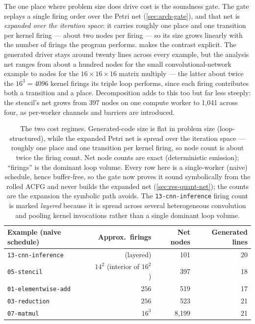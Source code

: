 The one place where problem size does drive cost is the soundness gate. The gate
replays a single firing order over the Petri net (\cref{sec:arch-gate}), and that net
is \emph{expanded over the iteration space}: it carries roughly one place and one
transition per kernel firing --- about two nodes per firing --- so its size grows
linearly with the number of firings the program performs.  makes
the contrast explicit. The generated driver stays around twenty lines across every
example, but the analysis net ranges from about a hundred nodes for the small
convolutional-network example to \qnetmatmul{} nodes for the $16\times16\times16$
matrix multiply --- the latter about twice the $16^3 = 4096$ kernel firings its triple
loop performs, since each firing contributes both a transition and a place.
Decomposition adds to this too but far less steeply: the stencil's net grows from 397
nodes on one compute worker to 1{,}041 across four, as per-worker channels and
barriers are introduced.

\begin{table}[t]
  \centering
  \small
  \begin{tabular}{@{}lrrr@{}}
    \toprule
    Example (naive schedule) & Approx.\ firings & Net nodes & Generated lines \\
    \midrule
    \texttt{13-cnn-inference} & (layered) & 101   & 20 \\
    \texttt{05-stencil}       & $14^2$ (interior of $16^2$) & 397 & 18 \\
    \texttt{01-elementwise-add} & $256$   & 519   & 17 \\
    \texttt{03-reduction}     & $256$     & 523   & 21 \\
    \texttt{07-matmul}        & $16^3$    & 8{,}199 & 21 \\
    \bottomrule
  \end{tabular}
  \caption{The two cost regimes. Generated-code size is flat in problem size
  (loop-structured), while the expanded Petri net is spread
  over the iteration space --- roughly one place and one transition per kernel firing,
  so node count is about twice the firing count. Net node counts are exact
  (deterministic emission); ``firings'' is the dominant loop volume. Every row here is a
  single-worker (naive) schedule, hence buffer-free, so the gate now proves it sound
  symbolically from the rolled ACFG and never builds the expanded net (\cref{sec:res-quant-net});
  the counts are the expansion the symbolic path avoids. The
  \texttt{13-cnn-inference} firing count is marked \emph{layered} because it is
  spread across several heterogeneous convolution and pooling kernel invocations
  rather than a single dominant loop volume.}
  \label{tab:quant-net}
\end{table}

